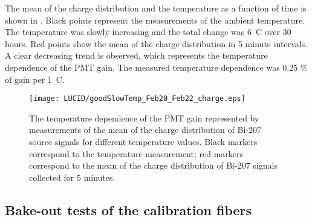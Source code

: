 The mean of the charge distribution and the temperature as a function of time is shown in .
Black points represent the measurements of the ambient temperature. The temperature was slowly increasing and the total change was 6\degree~C over 30 hours.
Red points show the mean of the charge distribution in 5 minute intervals.
A clear decreasing trend is observed, which represents the temperature dependence of the PMT gain.
The measured temperature dependence was 0.25 $\%$ of gain per 1\degree~C. 

\begin{figure}
\centering
\texttt{[image: LUCID/goodSlowTemp\_Feb20\_Feb22\_charge.eps]}
\caption{The temperature dependence of the PMT gain represented by measurements of the mean of the charge distribution of Bi-207 source signals 
for different temperature values.
Black markers correspond to the temperature measurement; red markers correspond to the mean of the charge distribution of Bi-207 signals collected for 5 minutes.}
\label{fig:PMTChargeTempDep}
\end{figure}

\subsection{Bake-out tests of the calibration fibers}
% 
% 
% 

